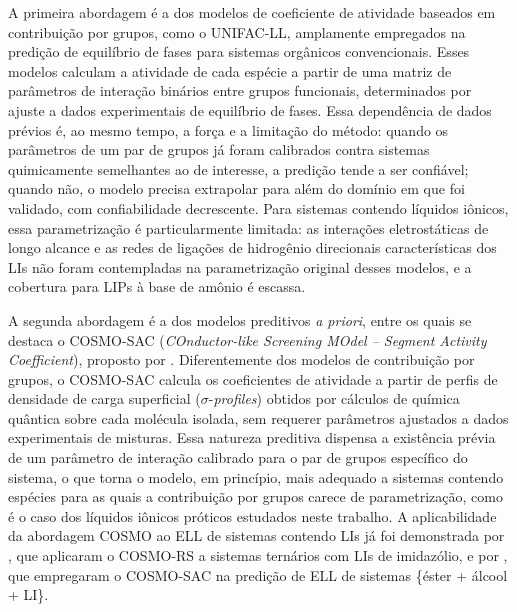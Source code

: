 A primeira abordagem é a dos modelos de coeficiente de atividade baseados em contribuição por grupos, como o UNIFAC-LL\cite{magnussen1981}, amplamente empregados na predição de equilíbrio de fases para sistemas orgânicos convencionais. Esses modelos calculam a atividade de cada espécie a partir de uma matriz de parâmetros de interação binários entre grupos funcionais, determinados por ajuste a dados experimentais de equilíbrio de fases. Essa dependência de dados prévios é, ao mesmo tempo, a força e a limitação do método: quando os parâmetros de um par de grupos já foram calibrados contra sistemas quimicamente semelhantes ao de interesse, a predição tende a ser confiável; quando não, o modelo precisa extrapolar para além do domínio em que foi validado, com confiabilidade decrescente. Para sistemas contendo líquidos iônicos, essa parametrização é particularmente limitada: as interações eletrostáticas de longo alcance e as redes de ligações de hidrogênio direcionais características dos LIs não foram contempladas na parametrização original desses modelos, e a cobertura para LIPs à base de amônio é escassa\cite{bahadur2015}.

A segunda abordagem é a dos modelos preditivos \textit{a priori}, entre os quais se destaca o COSMO-SAC (\textit{COnductor-like Screening MOdel -- Segment Activity Coefficient}), proposto por . Diferentemente dos modelos de contribuição por grupos, o COSMO-SAC calcula os coeficientes de atividade a partir de perfis de densidade de carga superficial ($\sigma$-\textit{profiles}) obtidos por cálculos de química quântica sobre cada molécula isolada, sem requerer parâmetros ajustados a dados experimentais de misturas\cite{lin2002}. Essa natureza preditiva dispensa a existência prévia de um parâmetro de interação calibrado para o par de grupos específico do sistema, o que torna o modelo, em princípio, mais adequado a sistemas contendo espécies para as quais a contribuição por grupos carece de parametrização, como é o caso dos líquidos iônicos próticos estudados neste trabalho. A aplicabilidade da abordagem COSMO ao ELL de sistemas contendo LIs já foi demonstrada por , que aplicaram o COSMO-RS a sistemas ternários com LIs de imidazólio, e por , que empregaram o COSMO-SAC na predição de ELL de sistemas \{éster + álcool + LI\}.

